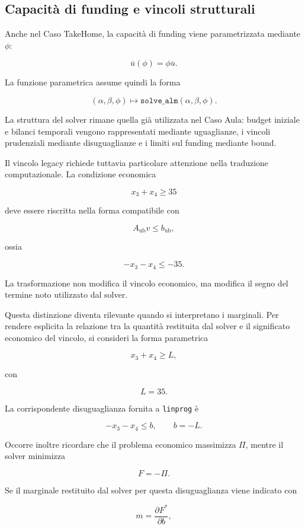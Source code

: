 \subsection{Capacit\`a di funding e vincoli strutturali}

Anche nel Caso TakeHome, la capacit\`a di funding viene parametrizzata mediante
$\phi$:

$$
\overline{u}(\phi)
=
\phi\overline{u}.
$$

La funzione parametrica assume quindi la forma

$$
(\alpha,\beta,\phi)
\longmapsto
\texttt{solve\_alm}(\alpha,\beta,\phi).
$$

La struttura del solver rimane quella gi\`a utilizzata nel Caso Aula:
budget iniziale e bilanci temporali vengono rappresentati mediante
uguaglianze, i vincoli prudenziali mediante disuguaglianze e i limiti sul
funding mediante bound.

Il vincolo legacy richiede tuttavia particolare attenzione nella traduzione
computazionale. La condizione economica

$$
x_3+x_4\geq 35
$$

\noindent deve essere riscritta nella forma compatibile con

$$
A_{\mathrm{ub}}v\leq b_{\mathrm{ub}},
$$

\noindent ossia

$$
-x_3-x_4\leq -35.
$$

La trasformazione non modifica il vincolo economico, ma modifica il segno del
termine noto utilizzato dal solver.


Questa distinzione diventa rilevante quando si interpretano i marginali. Per
rendere esplicita la relazione tra la quantit\`a restituita dal solver e il
significato economico del vincolo, si consideri la forma parametrica

\[
x_3+x_4\geq L,
\]

con

\[
L=35.
\]

La corrispondente disuguaglianza fornita a \texttt{linprog} \`e

\[
-x_3-x_4\leq b,
\qquad
b=-L.
\]

Occorre inoltre ricordare che il problema economico massimizza \(\Pi\), mentre
il solver minimizza

\[
F=-\Pi.
\]

Se il marginale restituito dal solver per questa disuguaglianza viene indicato
con

\[
m
=
\frac{\partial F^*}{\partial b},
\]

